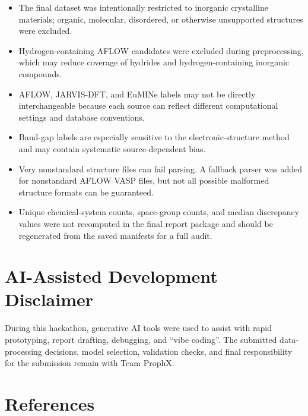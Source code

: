 \documentclass[10pt, a4paper]{article}
\begin{document}
\begin{itemize}
  \item The final dataset was intentionally restricted to inorganic crystalline materials; organic, molecular, disordered, or otherwise unsupported structures were excluded.
  \item Hydrogen-containing AFLOW candidates were excluded during preprocessing, which may reduce coverage of hydrides and hydrogen-containing inorganic compounds.
  \item AFLOW, JARVIS-DFT, and EuMINe labels may not be directly interchangeable because each source can reflect different computational settings and database conventions.
  \item Band-gap labels are especially sensitive to the electronic-structure method and may contain systematic source-dependent bias.
  \item Very nonstandard structure files can fail parsing. A fallback parser was added for nonstandard AFLOW VASP files, but not all possible malformed structure formats can be guaranteed.
  \item Unique chemical-system counts, space-group counts, and median discrepancy values were not recomputed in the final report package and should be regenerated from the saved manifests for a full audit.
\end{itemize}

\section*{AI-Assisted Development Disclaimer}
During this hackathon, generative AI tools were used to assist with rapid prototyping, report drafting, debugging, and ``vibe coding''. The submitted data-processing decisions, model selection, validation checks, and final responsibility for the submission remain with Team ProphX.

\section*{References}
\end{document}
